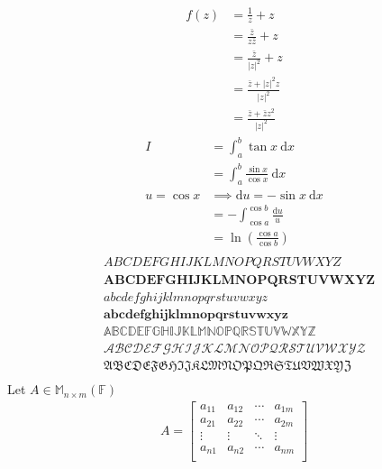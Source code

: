 \documentclass[a4paper,11pt]{article}
\theoremstyle{plain}
\theoremstyle{definition}
\newcommand{\M}{\mathbb{M}}
\newcommand{\F}{\mathbb{F}}
\newcommand{\dx}{\text{d}}
\begin{document}
\begin{align*}
	f(z)&=\frac{1}{z}+z\\
		&=\frac{\bar{z}}{z\bar{z}}+z\\
		&=\frac{\bar{z}}{|z|^2}+z \\
		&=\frac{\bar{z}+|z|^2z}{|z|^2}\\
		&=\frac{\bar{z}+\bar{z}z^2}{|z|^2}
\end{align*}
\begin{align*}
	I &= \int_a^b \tan x\ \dx x \\
	  &= \int_a^b \frac{\sin x}{\cos x}\ \dx x \\
	u = \cos x &\implies \dx u = -\sin x\ \dx x\\
	  &= -\int_{\cos a}^{\cos b} \frac{\dx u}{u} \\
	  &= \ln\left(\frac{\cos a}{{\cos b}}\right) \\
\end{align*}
\begin{align}
	&ABCDEFGHIJKLMNOPQRSTUVWXYZ\\
	&\mathbf{ABCDEFGHIJKLMNOPQRSTUVWXYZ}\\
	&abcdefghijklmnopqrstuvwxyz\\
	&\mathbf{abcdefghijklmnopqrstuvwxyz}\\
	&\mathbb{ABCDEFGHIJKLMNOPQRSTUVWXYZ}\\
	&\mathcal{ABCDEFGHIJKLMNOPQRSTUVWXYZ}\\
	&\mathfrak{ABCDEFGHIJKLMNOPQRSTUVWXYZ}\\
\end{align}
\newpage
Let $A\in\M_{n{\times}m}(\F)$
\begin{align*}
	A =
		\begin{bmatrix}
			a_{11} & a_{12} & \cdots & a_{1m} \\
			a_{21} & a_{22} & \cdots & a_{2m} \\
			\vdots & \vdots & \ddots & \vdots \\
			a_{n1} & a_{n2} & \cdots & a_{nm} \\
		\end{bmatrix}
\end{align*}
\end{document}
